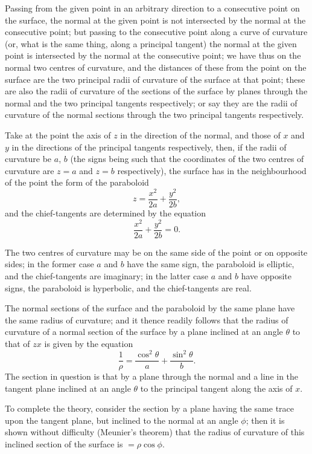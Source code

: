 \documentclass[11pt,a4paper]{article}
\begin{document}
Passing from the given point in an arbitrary direction to a consecutive point on the surface, the normal at the given point is not intersected by the normal at the consecutive point; but passing to the consecutive point along a curve of curvature (or, what is the same thing, along a principal tangent) the normal at the given point is intersected by the normal at the consecutive point; we have thus on the normal two centres of curvature, and the distances of these from the point on the surface are the two principal radii of curvature of the surface at that point; these are also the radii of curvature of the sections of the surface by planes through the normal and the two principal tangents respectively; or say they are the radii of curvature of the normal sections through the two principal tangents respectively.

Take at the point the axis of $z$ in the direction of the normal, and those of $x$ and $y$ in the directions of the principal tangents respectively, then, if the radii of curvature be $a$, $b$ (the signs being such that the coordinates of the two centres of curvature are $z = a$ and $z = b$ respectively), the surface has in the neighbourhood of the point the form of the paraboloid
\[
z = \frac{x^{2}}{2a} + \frac{y^{2}}{2b},
\]
and the chief-tangents are determined by the equation
\[
\frac{x^{2}}{2a} + \frac{y^{2}}{2b} = 0.
\]

The two centres of curvature may be on the same side of the point or on opposite sides; in the former case $a$ and $b$ have the same sign, the paraboloid is elliptic, and the chief-tangents are imaginary; in the latter case $a$ and $b$ have opposite signs, the paraboloid is hyperbolic, and the chief-tangents are real.

The normal sections of the surface and the paraboloid by the same plane have the same radius of curvature; and it thence readily follows that the radius of curvature of a normal section of the surface by a plane inclined at an angle $\theta$ to that of $zx$ is given by the equation
\[
\frac{1}{\rho} = \frac{\cos^{2}\theta}{a} + \frac{\sin^{2}\theta}{b}.
\]
The section in question is that by a plane through the normal and a line in the tangent plane inclined at an angle $\theta$ to the principal tangent along the axis of $x$.

To complete the theory, consider the section by a plane having the same trace upon the tangent plane, but inclined to the normal at an angle $\phi$; then it is shown without difficulty (Meunier's theorem) that the radius of curvature of this inclined section of the surface is $= \rho \cos\phi$.
\end{document}
